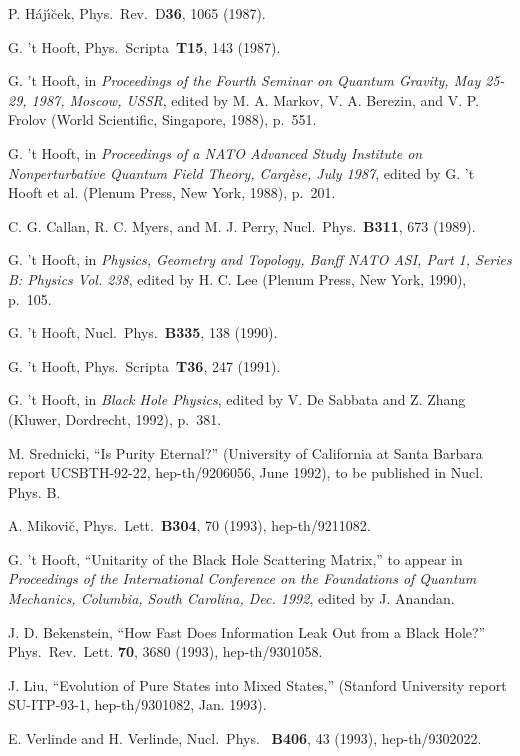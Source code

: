 \documentclass[12pt]{article}
\begin{document}
\begin{thebibliography}{999}
 P. H\'{a}j\'{\i}\u{c}ek, Phys.\ Rev.\ D{\bf 36}, 1065
(1987).

 G. 't Hooft, Phys.\ Scripta\ {\bf T15}, 143 (1987).

 G. 't Hooft, in {\em Proceedings of the Fourth
Seminar
on Quantum Gravity, May 25-29, 1987, Moscow, USSR}, edited by
M. A. Markov, V. A. Berezin, and V. P. Frolov (World Scientific,
Singapore, 1988), p.~551.

 G. 't Hooft, in {\em Proceedings of a NATO Advanced
Study Institute on Nonperturbative Quantum Field Theory, Carg\`{e}se,
July 1987}, edited by G. 't Hooft et al. (Plenum Press, New York,
1988),
p.~201.

 C. G. Callan, R. C. Myers, and M. J. Perry,
Nucl.\ Phys.\ {\bf B311}, 673 (1989).

 G. 't Hooft, in {\em Physics, Geometry and Topology,
Banff NATO ASI, Part 1, Series B:  Physics Vol. 238}, edited by H. C.
Lee
(Plenum Press, New York, 1990), p.~105.

 G. 't Hooft, Nucl.\ Phys.\ {\bf B335}, 138 (1990).

 G. 't Hooft, Phys.\ Scripta\ {\bf T36}, 247 (1991).

 G. 't Hooft, in {\em Black Hole Physics}, edited by
V. De
Sabbata and Z. Zhang (Kluwer, Dordrecht, 1992), p.~381.

 M. Srednicki, ``Is Purity Eternal?'' (University of
California
at Santa Barbara report UCSBTH-92-22, hep-th/9206056, June 1992),
to be published in Nucl. Phys. B.

 A. Mikovi\u{c}, Phys.\ Lett.\ {\bf B304}, 70 (1993),
hep-th/9211082.

 G. 't Hooft, ``Unitarity of the Black Hole Scattering
Matrix,'' to appear in {\em Proceedings of the International
Conference
on the Foundations of Quantum Mechanics, Columbia, South Carolina,
Dec. 1992}, edited by J. Anandan.

 J. D. Bekenstein, ``How Fast Does Information Leak
Out
from a Black Hole?'' Phys.\ Rev.\ Lett. {\bf 70}, 3680 (1993),
hep-th/9301058.

 J. Liu, ``Evolution of Pure States into Mixed States,''
(Stanford University report SU-ITP-93-1, hep-th/9301082, Jan. 1993).

 E. Verlinde and H. Verlinde, Nucl.\ Phys.\ {\bf
B406},
43 (1993), hep-th/9302022.


\end{thebibliography}
\end{document}
